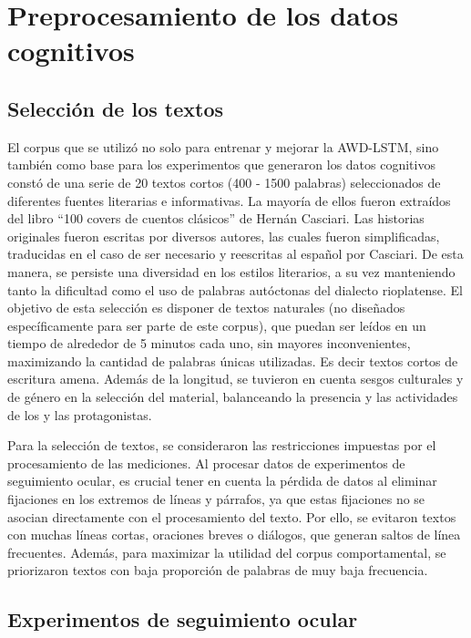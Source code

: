 \chapter{Preprocesamiento de los datos cognitivos}

\section{Selección de los textos}

El corpus que se utilizó no solo para entrenar y mejorar la AWD-LSTM, sino también como base para los experimentos que generaron los datos cognitivos constó de una serie de 20 textos cortos (400 - 1500 palabras) seleccionados de diferentes fuentes literarias e informativas. La mayoría de ellos fueron extraídos del libro “100 covers de cuentos clásicos” de Hernán Casciari. Las historias originales fueron escritas por diversos autores, las cuales fueron simplificadas, traducidas en el caso de ser necesario y reescritas al español por Casciari. De esta manera, se persiste una diversidad en los estilos literarios, a su vez manteniendo tanto la dificultad como el uso de palabras autóctonas del dialecto rioplatense. El objetivo de esta selección es disponer de textos naturales (no diseñados específicamente para ser parte de este corpus), que puedan ser leídos en un tiempo de alrededor de 5 minutos cada uno, sin mayores inconvenientes, maximizando la cantidad de palabras únicas utilizadas. Es decir textos cortos de escritura amena. Además de la longitud, se tuvieron en cuenta sesgos culturales y de género en la selección del material, balanceando la presencia y las actividades de los y las protagonistas.

Para la selección de textos, se consideraron las restricciones impuestas por el procesamiento de las mediciones. Al procesar datos de experimentos de seguimiento ocular, es crucial tener en cuenta la pérdida de datos al eliminar fijaciones en los extremos de líneas y párrafos, ya que estas fijaciones no se asocian directamente con el procesamiento del texto. \parencite{Rayner1998} Por ello, se evitaron textos con muchas líneas cortas, oraciones breves o diálogos, que generan saltos de línea frecuentes. Además, para maximizar la utilidad del corpus comportamental, se priorizaron textos con baja proporción de palabras de muy baja frecuencia. \parencite{Inhoff1984}

\section{Experimentos de seguimiento ocular}

